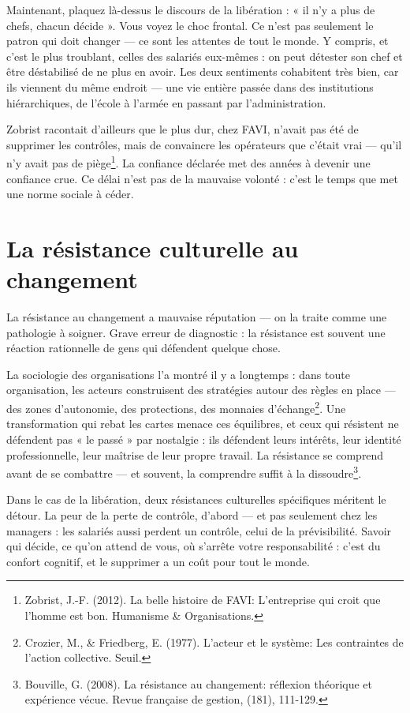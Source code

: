 Maintenant, plaquez là-dessus le discours de la libération : « il n'y a plus de chefs, chacun décide ». Vous voyez le choc frontal. Ce n'est pas seulement le patron qui doit changer — ce sont les attentes de tout le monde. Y compris, et c'est le plus troublant, celles des salariés eux-mêmes : on peut détester son chef et être déstabilisé de ne plus en avoir. Les deux sentiments cohabitent très bien, car ils viennent du même endroit — une vie entière passée dans des institutions hiérarchiques, de l'école à l'armée en passant par l'administration.

Zobrist racontait d'ailleurs que le plus dur, chez FAVI, n'avait pas été de supprimer les contrôles, mais de convaincre les opérateurs que c'était vrai — qu'il n'y avait pas de piège\footnote{Zobrist, J.-F. (2012). La belle histoire de FAVI: L'entreprise qui croit que l'homme est bon. Humanisme \& Organisations.}. La confiance déclarée met des années à devenir une confiance crue. Ce délai n'est pas de la mauvaise volonté : c'est le temps que met une norme sociale à céder.

\section{La résistance culturelle au changement}

La résistance au changement a mauvaise réputation — on la traite comme une pathologie à soigner. Grave erreur de diagnostic : la résistance est souvent une réaction rationnelle de gens qui défendent quelque chose.

La sociologie des organisations l'a montré il y a longtemps : dans toute organisation, les acteurs construisent des stratégies autour des règles en place — des zones d'autonomie, des protections, des monnaies d'échange\footnote{Crozier, M., \& Friedberg, E. (1977). L'acteur et le système: Les contraintes de l'action collective. Seuil.}. Une transformation qui rebat les cartes menace ces équilibres, et ceux qui résistent ne défendent pas « le passé » par nostalgie : ils défendent leurs intérêts, leur identité professionnelle, leur maîtrise de leur propre travail. La résistance se comprend avant de se combattre — et souvent, la comprendre suffit à la dissoudre\footnote{Bouville, G. (2008). La résistance au changement: réflexion théorique et expérience vécue. Revue française de gestion, (181), 111-129.}.

Dans le cas de la libération, deux résistances culturelles spécifiques méritent le détour. La peur de la perte de contrôle, d'abord — et pas seulement chez les managers : les salariés aussi perdent un contrôle, celui de la prévisibilité. Savoir qui décide, ce qu'on attend de vous, où s'arrête votre responsabilité : c'est du confort cognitif, et le supprimer a un coût pour tout le monde.

